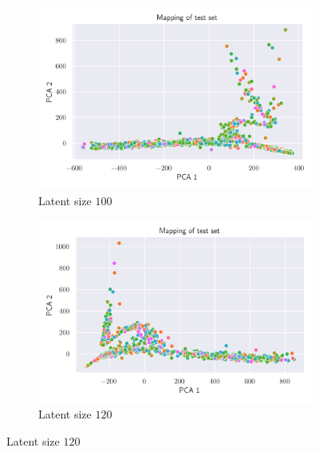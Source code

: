 \documentclass[12pt,a4paper]{article}
\begin{document}
\begin{figure}[H]
    \medskip
    \begin{subfigure}{0.48\textwidth}
    \includegraphics[width=\textwidth]{src/gaussian_pca_100.png}
    \caption{Latent size $100$} 
    \end{subfigure}\hspace*{\fill}
    \begin{subfigure}{0.48\textwidth}
    \includegraphics[width=\textwidth]{src/gaussian_pca_120.png}
    \caption{Latent size $120$}
    \end{subfigure}
    

\end{figure}
\end{document}
